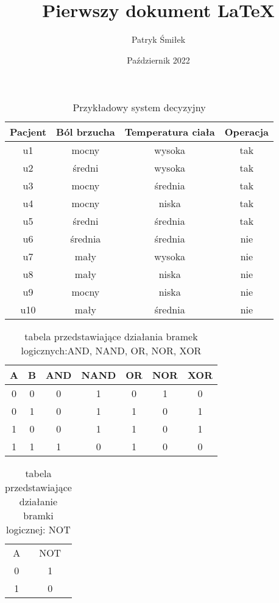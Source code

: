 \documentclass[12pt, letterpaper, titlepage]{article}
\title{Pierwszy dokument LaTeX}
\author{Patryk Śmiłek}
\date{Październik 2022}
\begin{document}
\maketitle




\begin{table}[h]
\centering\caption{Przykładowy system decyzyjny}
\centering
\begin{tabular}{c|c c c}
\hline
\hline
Pacjent & Ból brzucha & Temperatura ciała & Operacja\\
\hline
u1 & mocny & wysoka & tak\\
u2 & średni & wysoka & tak\\
u3 & mocny & średnia & tak\\
u4 & mocny & niska & tak\\
u5 & średni & średnia & tak\\
u6 & średnia & średnia & nie \\
u7 & mały & wysoka & nie \\
u8 & mały & niska & nie\\
u9 & mocny& niska & nie\\
u10 & mały& średnia & nie\\
\hline
\hline
\end{tabular}
\end{table}

\begin{table}[h]
\centering\caption{ tabela przedstawiające działania bramek logicznych:AND, NAND, OR, NOR,
XOR}
\centering
\begin{tabular}{|c c|c|c|c|c|c|}
\hline
A & B & AND & NAND & OR & NOR & XOR\\
\hline
0 & 0 & 0 & 1 & 0 & 1 & 0\\
0 & 1 & 0 & 1 & 1 & 0 & 1\\
1 & 0 & 0 & 1 & 1 & 0 & 1\\
1 & 1 & 1 & 0 & 1 & 0 & 0\\
\hline
\end{tabular}
\end{table}

\begin{table}[h]
\centering\caption{ tabela przedstawiające działanie bramki logicznej: NOT}
\centering
\begin{tabular}{|c|c| }
\hline
A & NOT \\
0 & 1\\
1 & 0\\
\hline
\end{tabular}
\end{table}
\end{document}
